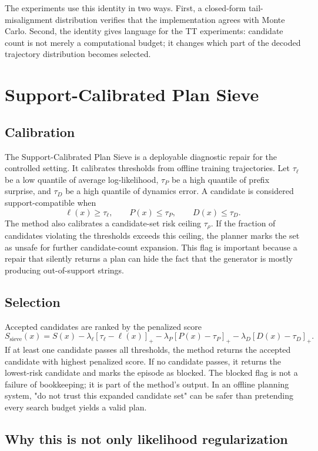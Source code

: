 \documentclass{article}
\newcommand{\method}{Support-Calibrated Plan Sieve}
\newcommand{\score}{S}
\begin{document}
The experiments use this identity in two ways. First, a closed-form tail-misalignment distribution verifies that the implementation agrees with Monte Carlo. Second, the identity gives language for the TT experiments: candidate count is not merely a computational budget; it changes which part of the decoded trajectory distribution becomes selected.

\section{Support-Calibrated Plan Sieve}

\subsection{Calibration}

The \method{} is a deployable diagnostic repair for the controlled setting. It calibrates thresholds from offline training trajectories. Let \(\tau_\ell\) be a low quantile of average log-likelihood, \(\tau_P\) be a high quantile of prefix surprise, and \(\tau_D\) be a high quantile of dynamics error. A candidate is considered support-compatible when
\[
\ell(x)\geq \tau_\ell,\qquad P(x)\leq \tau_P,\qquad D(x)\leq \tau_D.
\]
The method also calibrates a candidate-set risk ceiling \(\tau_\rho\). If the fraction of candidates violating the thresholds exceeds this ceiling, the planner marks the set as unsafe for further candidate-count expansion. This flag is important because a repair that silently returns a plan can hide the fact that the generator is mostly producing out-of-support strings.

\subsection{Selection}

Accepted candidates are ranked by the penalized score
\[
\score_{\mathrm{sieve}}(x)=\score(x)
-\lambda_\ell[\tau_\ell-\ell(x)]_+
-\lambda_P[P(x)-\tau_P]_+
-\lambda_D[D(x)-\tau_D]_+.
\]
If at least one candidate passes all thresholds, the method returns the accepted candidate with highest penalized score. If no candidate passes, it returns the lowest-risk candidate and marks the episode as blocked. The blocked flag is not a failure of bookkeeping; it is part of the method's output. In an offline planning system, "do not trust this expanded candidate set" can be safer than pretending every search budget yields a valid plan.

\subsection{Why this is not only likelihood regularization}
\end{document}
